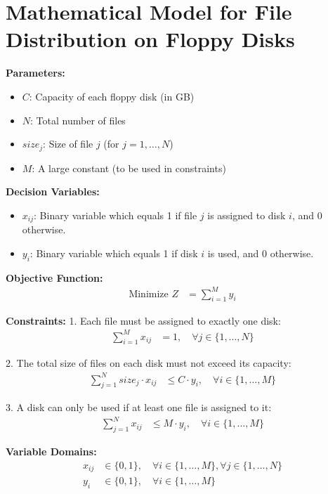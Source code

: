 \documentclass{article}
\begin{document}
\section*{Mathematical Model for File Distribution on Floppy Disks}

\textbf{Parameters:}
\begin{itemize}
    \item $C$: Capacity of each floppy disk (in GB)
    \item $N$: Total number of files
    \item $size_j$: Size of file $j$ (for $j = 1, \ldots, N$)
    \item $M$: A large constant (to be used in constraints)
\end{itemize}

\textbf{Decision Variables:}
\begin{itemize}
    \item $x_{ij}$: Binary variable which equals 1 if file $j$ is assigned to disk $i$, and 0 otherwise.
    \item $y_i$: Binary variable which equals 1 if disk $i$ is used, and 0 otherwise.
\end{itemize}

\textbf{Objective Function:}
\begin{align*}
\text{Minimize } Z &= \sum_{i=1}^M y_i
\end{align*}

\textbf{Constraints:}
1. Each file must be assigned to exactly one disk:
\begin{align*}
\sum_{i=1}^M x_{ij} &= 1, \quad \forall j \in \{1, \ldots, N\}
\end{align*}

2. The total size of files on each disk must not exceed its capacity:
\begin{align*}
\sum_{j=1}^N size_j \cdot x_{ij} &\leq C \cdot y_i, \quad \forall i \in \{1, \ldots, M\}
\end{align*}

3. A disk can only be used if at least one file is assigned to it:
\begin{align*}
\sum_{j=1}^N x_{ij} &\leq M \cdot y_i, \quad \forall i \in \{1, \ldots, M\}
\end{align*}

\textbf{Variable Domains:}
\begin{align*}
x_{ij} &\in \{0, 1\}, \quad \forall i \in \{1, \ldots, M\}, \forall j \in \{1, \ldots, N\} \\
y_i &\in \{0, 1\}, \quad \forall i \in \{1, \ldots, M\}
\end{align*}
\end{document}
